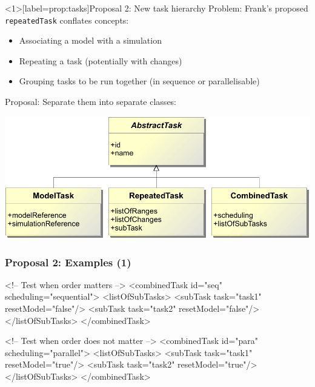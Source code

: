 \documentclass[t,xcolor={usenames,dvipsnames}]{beamer}
\newcommand{\sedml}[1]{\lstinline[basicstyle=\color{blue}]!#1!}
\begin{document}

\begin{frame}<1>[label=prop:tasks]{Proposal 2: New task hierarchy}
\alert{Problem}:
 Frank's proposed \sedml{repeatedTask} conflates concepts:
\begin{itemize}
\item Associating a model with a simulation
\item Repeating a task (potentially with changes)
\item Grouping tasks to be run together (in sequence or parallelisable)
\end{itemize}

\alert{Proposal}:
 Separate them into separate classes:
\begin{center}
\includegraphics[width=\textwidth]{task_uml}
\end{center}
\end{frame}


\begin{frame}[fragile=singleslide]
\frametitle{Proposal 2: Examples (1)}
\begin{blksedml}
<!-- Test when order matters -->
<combinedTask id="seq" scheduling="sequential">
    <listOfSubTasks>
        <subTask task="task1" resetModel="false"/>
        <subTask task="task2" resetModel="false"/>
    </listOfSubTasks>
</combinedTask>

<!-- Test when order does not matter -->
<combinedTask id="para" scheduling="parallel">
    <listOfSubTasks>
        <subTask task="task1" resetModel="true"/>
        <subTask task="task2" resetModel="true"/>
    </listOfSubTasks>
</combinedTask>
\end{blksedml}
\end{frame}
        
\end{document}
